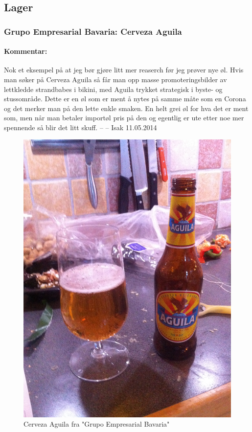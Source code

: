 \documentclass[12pt,a4paper,oneside,norsk]{article}
\begin{document}
\newpage
\subsection{Lager}
\subsubsection{Grupo Empresarial Bavaria: Cerveza Aguila}
\paragraph{Kommentar:} Nok et eksempel på at jeg bør gjøre litt mer reaserch før jeg prøver nye øl. Hvis man søker på Cerveza Aguila så får man opp masse promoteringsbilder av lettkledde strandbabes i bikini, med Aguila trykket strategisk i byste- og stussområde. Dette er en øl som er ment å nytes på samme måte som en Corona og det merker man på den lette enkle smaken. En helt grei øl for hva det er ment som, men når man betaler importøl pris på den og egentlig er ute etter noe mer spennende så blir det litt skuff. 
\newline
-- -- Isak 11.05.2014

\begin{figure} [H]
\centering
\includegraphics[scale=0.08, angle=270]{Bilder/OL/CervezaAguila.jpg}
\caption{Cerveza Aguila fra "Grupo Empresarial Bavaria"}
\end{figure}   
\end{document}
